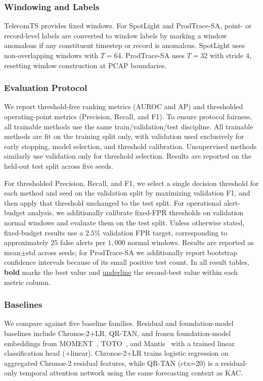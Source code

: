 \documentclass[conference]{IEEEtran}
\begin{document}
\subsubsection{Windowing and Labels}
\label{sec:windowing}

TelecomTS provides fixed windows. For SpotLight and ProdTrace-SA, point- or record-level labels are converted to window labels by marking a window anomalous if any constituent timestep or record is anomalous. SpotLight uses non-overlapping windows with $T=64$. ProdTrace-SA uses $T=32$ with stride $4$, resetting window construction at PCAP boundaries.

\subsubsection{Evaluation Protocol}
\label{sec:protocol}

We report threshold-free ranking metrics (AUROC and AP) and thresholded operating-point metrics (Precision, Recall, and F1). To ensure protocol fairness, all trainable methods use the same train/validation/test discipline. All trainable methods are fit on the training split only, with validation used exclusively for early stopping, model selection, and threshold calibration. Unsupervised methods similarly use validation only for threshold selection. Results are reported on the held-out test split across five seeds.

For thresholded Precision, Recall, and F1, we select a single decision threshold for each method and seed on the validation split by maximizing validation F1, and then apply that threshold unchanged to the test split. For operational alert-budget analysis, we additionally calibrate fixed-FPR thresholds on validation normal windows and evaluate them on the test split. Unless otherwise stated, fixed-budget results use a $2.5\%$ validation FPR target, corresponding to approximately $25$ false alerts per $1{,}000$ normal windows. Results are reported as mean$\pm$std across seeds; for ProdTrace-SA we additionally report bootstrap confidence intervals because of its small positive test count. In all result tables, \textbf{bold} marks the best value and \underline{underline} the second-best value within each metric column.

\subsubsection{Baselines}
\label{sec:baselines}

We compare against five baseline families. Residual and foundation-model baselines include Chronos-2+LR, QR-TAN, and frozen foundation-model embeddings from MOMENT~\cite{goswami2024moment}, TOTO~\cite{cohen2025toto}, and Mantis~\cite{feofanov2025mantis} with a trained linear classification head (+linear). Chronos-2+LR trains logistic regression on aggregated Chronos-2 residual features, while QR-TAN (ctx=20) is a residual-only temporal attention network using the same forecasting context as KAC.
\end{document}
